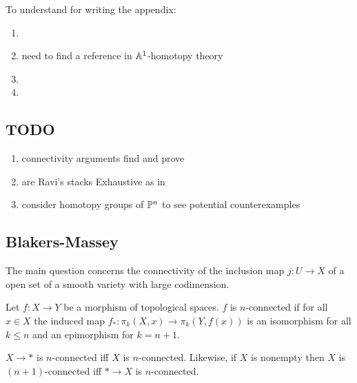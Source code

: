 \documentclass[12pt]{article}
\begin{document}
To understand for writing the appendix:

\begin{enumerate}
\item {}

\item {} need to find a reference in $\A^1$-homotopy theory

\item {}

\item {}
\end{enumerate}

\subsection{TODO}

\begin{enumerate}
\item connectivity arguments find and prove
\item are Ravi's stacks Exhaustive as in 
\item consider homotopy groups of $\P^n$ to see potential counterexamples
\end{enumerate}


\subsection{Blakers-Massey}

The main question concerns the connectivity of the inclusion map $j : U \to X$ of a open set of a smooth variety with large codimension.

\begin{defn}
Let $f : X \to Y$ be a morphism of topological spaces. $f$ is $n$-connected if for all $x \in X$ the induced map $f_* : \pi_k(X, x) \to \pi_k(Y, f(x))$ is an isomorphism for all $k \le n$ and an epimorphism for $k = n+1$. 
\end{defn}

\begin{rmk}
$X \to *$ is $n$-connected iff $X$ is $n$-connected. Likewise, if $X$ is nonempty then $X$ is $(n+1)$-connected iff $* \to X$ is $n$-connected. 
\end{rmk}
\end{document}

